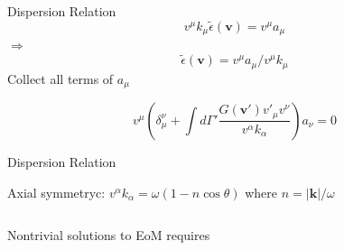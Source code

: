 \documentclass[9pt]{beamer}
\begin{document}
\begin{darkframes}
\begin{frame}{Dispersion Relation}
\begin{equation*}
    v^\mu k_\mu \tilde \epsilon (\boldsymbol{v}) = v^\mu a_\mu
\end{equation*}
\pause
{\centering
$\Longrightarrow$
\begin{equation*}
    \tilde \epsilon (\boldsymbol{v}) = v^\mu a_\mu/v^\mu k_\mu
\end{equation*}
}
Collect all terms of $a_\mu$

\begin{equation*}
    v^\mu \left( \delta_\mu^\nu +  \int d\Gamma' \frac{ G(\boldsymbol{ v}') v'_\mu v^\nu }{ v^\alpha k_\alpha }   \right) a_\nu = 0
\end{equation*}

\end{frame}


\begin{frame}{Dispersion Relation}


\begin{tcolorbox}[standard jigsaw, opacityback=0, coltext=white]
Axial symmetryc: $v^\alpha k_\alpha = \omega (1 - n \cos \theta)$ where $n = \lvert \boldsymbol{k} \rvert / \omega $
\end{tcolorbox}

\begin{columns}[T]
    \begin{column}{0.5\textwidth}
Nontrivial solutions to EoM requires



\end{column}
\end{columns}
\end{frame}
\end{darkframes}
\end{document}
